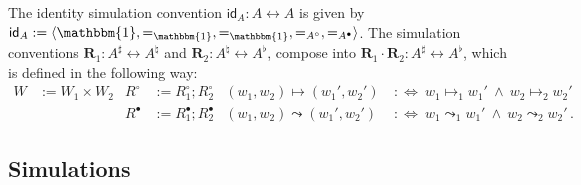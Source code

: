 \documentclass[acmsmall,screen,review,anonymous]{acmart}
\newcommand{\kw}[1]{\ensuremath{ \mathsf{#1} }}
\newcommand{\que}{\circ}
\newcommand{\ans}{\bullet}
\newcommand{\intl}[1]{\underline{#1}}
\begin{document}

\begin{definition} \label{def:sccomp}
The identity simulation convention
$\kw{id}_A : A \leftrightarrow A$
is given by
$\kw{id}_A := \langle
    \mathbbm{1}, {=}_\mathbbm{1}, {=}_\mathbbm{1}, {=}_{A^\que}, {=}_{A^\ans}
 \rangle$.
The simulation conventions
$\mathbf{R}_1 : A^\sharp \leftrightarrow A^\natural$ and
$\mathbf{R}_2 : A^\natural \leftrightarrow A^\flat$,
compose into
$\mathbf{R}_1 \cdot \mathbf{R}_2 : A^\sharp \leftrightarrow A^\flat$,
which is defined in the following way:
\begin{align*}
  W &:= W_1 \times W_2 &
  R^\que &:= R_1^\que \mathbin; R_2^\que &
  (w_1, w_2) \mapsto (w_1', w_2') \: &:\Leftrightarrow \:
    w_1 \mapsto_1 w_1' \: \wedge \:
    w_2 \mapsto_2 w_2' \\
&&  R^\ans &:= R_1^\ans \mathbin; R_2^\ans &
  (w_1, w_2) \leadsto (w_1', w_2') \: &:\Leftrightarrow \:
    w_1 \leadsto_1 w_1' \: \wedge \:
    w_2 \leadsto_2 w_2'
  \,.
\end{align*}
\end{definition}


\subsection{Simulations} \label{sec:base:sim} %
\end{document}
